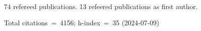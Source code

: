 74 refereed publications. 13 refeered publications as first author.

Total citations~=~4156; h-index~=~35 (2024-07-09)